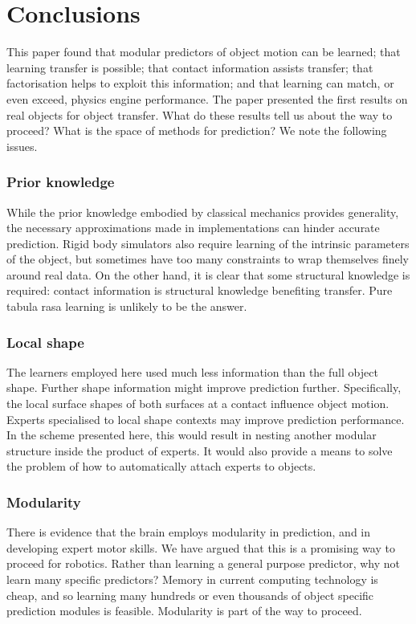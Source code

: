 
\section{Conclusions}\label{sec:Discussion}

This paper found that modular predictors of object motion can be learned; that learning transfer is possible; that contact information assists transfer; that factorisation helps to exploit this information; and that learning can match, or even exceed, physics engine performance. The paper presented the first results on real objects for object transfer. What do these results tell us about the way to proceed? What is the space of methods for prediction? We note the following issues.

\subsubsection{Prior knowledge} While the prior knowledge embodied by classical mechanics provides generality, the necessary approximations made in implementations can hinder accurate prediction. Rigid body simulators also require learning of the intrinsic parameters of the object, but sometimes have too many constraints to wrap themselves finely around real data. On the other hand, it is clear that some structural knowledge is required: contact information is structural knowledge benefiting transfer. Pure tabula rasa learning is unlikely to be the answer.

\subsubsection{ Local shape} The learners employed here used much less information than the full object shape. Further shape information might improve prediction further. Specifically, the local surface shapes of both surfaces at a contact influence object motion. Experts specialised to local shape contexts may improve prediction performance. In the scheme presented here, this would result in nesting another modular structure inside the product of experts. It would also provide a means to solve the problem of how to automatically attach experts to objects.

\subsubsection{ Modularity} There is evidence that the brain employs modularity in prediction, and in developing expert motor skills. We have argued that this is a promising way to proceed for robotics. Rather than learning a general purpose predictor, why not learn many specific predictors? Memory in current computing technology is cheap, and so learning many hundreds or even thousands of object specific prediction modules is feasible. Modularity is part of the way to proceed.

